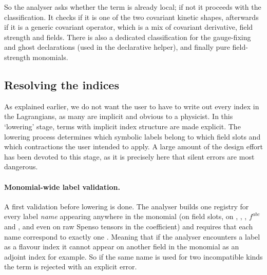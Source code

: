 So the analyser asks whether the term is already local; if not it proceeds with the classification. It checks if it is one of the two covariant kinetic shapes, afterwards if it is a generic covariant operator, which is a mix of covariant derivative, field strength and fields. There is also a dedicated classification for the gauge-fixing and ghost declarations (used in the declarative helper), and finally pure field-strength monomials.

\subsection{Resolving the indices}

As explained earlier, we do not want the user to have to write out every index in the Lagrangians, as many are implicit and obvious to a physicist. In this `lowering' stage, terms with implicit index structure are made explicit. The lowering process determines which symbolic labels belong to which field slots and which contractions the user intended to apply. A large amount of the design effort has been devoted to this stage, as it is precisely here that silent errors are most dangerous.


\paragraph{Monomial-wide label validation.} A first validation before lowering is done. The analyser builds one registry for every label \emph{name} appearing anywhere in the monomial (on field slots, on , , , $f^{abc}$ and , and even on raw Spenso tensors in the coefficient) and requires that each name correspond to exactly one . Meaning that if the analyser encounters a label  as a flavour index it cannot appear on another field in the monomial as an adjoint index for example. So if the same name is used for two incompatible kinds the term is rejected with an explicit error.


